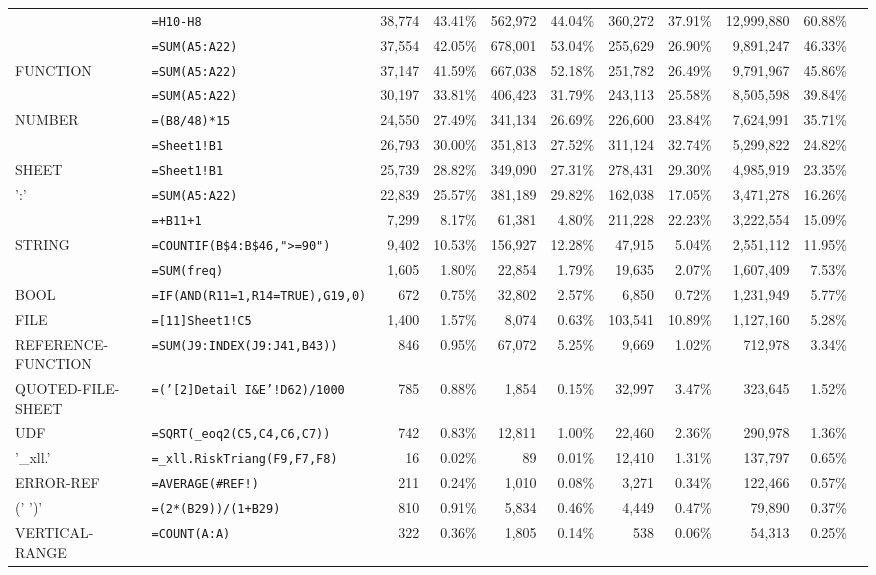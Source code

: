 \documentclass[conference]{IEEEtran}
\begin{document}
\begin{table*}
\begin{tabular}{llrrrrrrrrr}
		\synt{BinOp} & \texttt{=H10-H8} & 38,774 & 43.41\% & 562,972 & 44.04\% & 360,272 & 37.91\% & 12,999,880 & 60.88\%\\
		\synt{Function} & \texttt{=SUM(A5:A22)} & 37,554 & 42.05\% & 678,001 & 53.04\% & 255,629 & 26.90\% & 9,891,247 & 46.33\%\\
		FUNCTION & \texttt{=SUM(A5:A22)} & 37,147 & 41.59\% & 667,038 & 52.18\% & 251,782 & 26.49\% & 9,791,967 & 45.86\%\\
		\synt{Constant} & \texttt{=SUM(A5:A22)} & 30,197 & 33.81\% & 406,423 & 31.79\% & 243,113 & 25.58\% & 8,505,598 & 39.84\%\\
		NUMBER & \texttt{=(B8/48)*15} & 24,550 & 27.49\% & 341,134 & 26.69\% & 226,600 & 23.84\% & 7,624,991 & 35.71\%\\
		\synt{Prefix} & \texttt{=Sheet1!B1} & 26,793 & 30.00\% & 351,813 & 27.52\% & 311,124 & 32.74\% & 5,299,822 & 24.82\%\\
		SHEET & \texttt{=Sheet1!B1} & 25,739 & 28.82\% & 349,090 & 27.31\% & 278,431 & 29.30\% & 4,985,919 & 23.35\%\\
		\synt{Reference} ':' \synt{Reference} & \texttt{=SUM(A5:A22)} & 22,839 & 25.57\% & 381,189 & 29.82\% & 162,038 & 17.05\% & 3,471,278 & 16.26\%\\
		\synt{UnOpPrefix} & \texttt{=+B11+1} & 7,299 & 8.17\% & 61,381 & 4.80\% & 211,228 & 22.23\% & 3,222,554 & 15.09\%\\
		STRING & \texttt{=COUNTIF(B\$4:B\$46,">=90")} & 9,402 & 10.53\% & 156,927 & 12.28\% & 47,915 & 5.04\% & 2,551,112 & 11.95\%\\
		\synt{NamedRange} & \texttt{=SUM(freq)} & 1,605 & 1.80\% & 22,854 & 1.79\% & 19,635 & 2.07\% & 1,607,409 & 7.53\%\\
		BOOL & \texttt{=IF(AND(R11=1,R14=TRUE),G19,0)} & 672 & 0.75\% & 32,802 & 2.57\% & 6,850 & 0.72\% & 1,231,949 & 5.77\%\\
		FILE & \texttt{=[11]Sheet1!C5} & 1,400 & 1.57\% & 8,074 & 0.63\% & 103,541 & 10.89\% & 1,127,160 & 5.28\%\\
		REFERENCE-FUNCTION & \texttt{=SUM(J9:INDEX(J9:J41,B43))} & 846 & 0.95\% & 67,072 & 5.25\% & 9,669 & 1.02\% & 712,978 & 3.34\%\\	
		QUOTED-FILE-SHEET & \texttt{=('[2]Detail I\&E'!D62)/1000} & 785 & 0.88\% & 1,854 & 0.15\% & 32,997 & 3.47\% & 323,645 & 1.52\%\\
		UDF & \texttt{=SQRT(_eoq2(C5,C4,C6,C7))} & 742 & 0.83\% & 12,811 & 1.00\% & 22,460 & 2.36\% & 290,978 & 1.36\%\\
		'_xll.' & \texttt{=_xll.RiskTriang(F9,F7,F8)} & 16 & 0.02\% & 89 & 0.01\% & 12,410 & 1.31\% & 137,797 & 0.65\%\\
		ERROR-REF & \texttt{=AVERAGE(\#REF!)} & 211 & 0.24\% & 1,010 & 0.08\% & 3,271 & 0.34\% & 122,466 & 0.57\%\\
		(' \synt{Reference} ')' & \texttt{=(2*(B29))/(1+B29)} & 810 & 0.91\% & 5,834 & 0.46\% & 4,449 & 0.47\% & 79,890 & 0.37\%\\
		VERTICAL-RANGE & \texttt{=COUNT(A:A)} & 322 & 0.36\% & 1,805 & 0.14\% & 538 & 0.06\% & 54,313 & 0.25\%\\
		

\end{tabular}
\end{table*}
\end{document}

